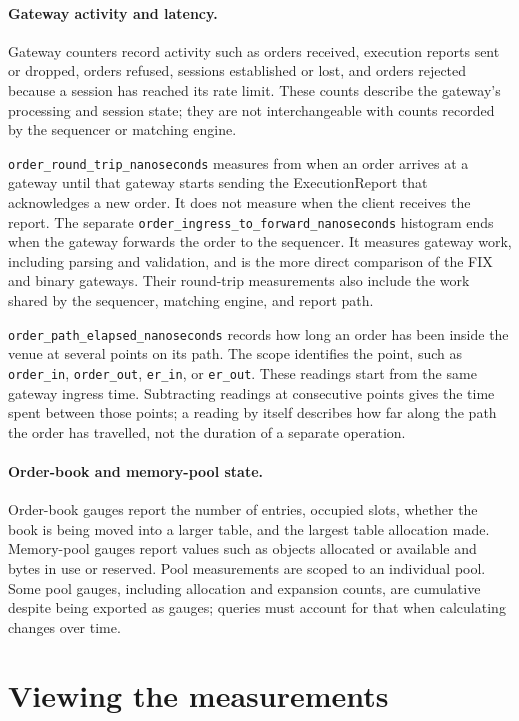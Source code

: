\paragraph{Gateway activity and latency.}
Gateway counters record activity such as orders received, execution reports sent or
dropped, orders refused, sessions established or lost, and orders rejected because a
session has reached its rate limit. These counts describe the gateway's processing and
session state; they are not interchangeable with counts recorded by the sequencer or
matching engine.

\texttt{order\_round\_trip\_nanoseconds} measures from when an order arrives at a gateway
until that gateway starts sending the ExecutionReport that acknowledges a new order. It
does not measure when the client receives the report. The separate
\texttt{order\_ingress\_to\_forward\_nanoseconds} histogram ends when the gateway forwards
the order to the sequencer. It measures gateway work, including parsing and validation,
and is the more direct comparison of the FIX and binary gateways. Their round-trip
measurements also include the work shared by the sequencer, matching engine, and report
path.

\texttt{order\_path\_elapsed\_nanoseconds} records how long an order has been inside the
venue at several points on its path. The scope identifies the point, such as
\texttt{order\_in}, \texttt{order\_out}, \texttt{er\_in}, or \texttt{er\_out}. These
readings start from the same gateway ingress time. Subtracting readings at consecutive
points gives the time spent between those points; a reading by itself describes how far
along the path the order has travelled, not the duration of a separate operation.

\paragraph{Order-book and memory-pool state.}
Order-book gauges report the number of entries, occupied slots, whether the book is being
moved into a larger table, and the largest table allocation made. Memory-pool gauges
report values such as objects allocated or available and bytes in use or reserved. Pool
measurements are scoped to an individual pool. Some pool gauges, including allocation
and expansion counts, are cumulative despite being exported as gauges; queries must
account for that when calculating changes over time.

\section{Viewing the measurements}

